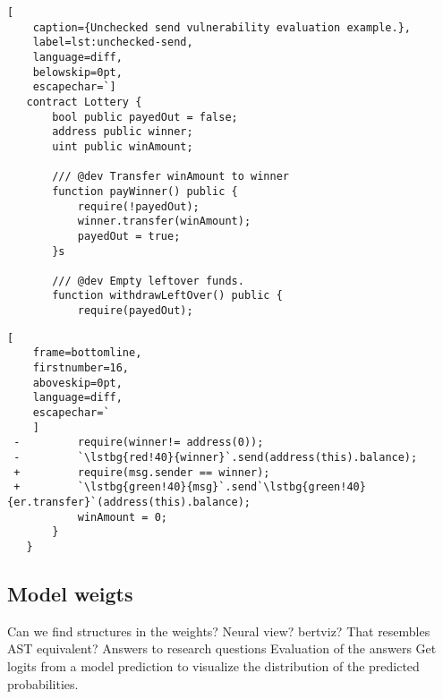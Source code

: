 \begin{lstlisting}[
    caption={Unchecked send vulnerability evaluation example.},
    label=lst:unchecked-send,
    language=diff,
    belowskip=0pt,
    escapechar=`]
   contract Lottery {
       bool public payedOut = false;
       address public winner;
       uint public winAmount;
       
       /// @dev Transfer winAmount to winner
       function payWinner() public {
           require(!payedOut);
           winner.transfer(winAmount);
           payedOut = true;
       }s

       /// @dev Empty leftover funds.
       function withdrawLeftOver() public {
           require(payedOut);
\end{lstlisting}
\begin{lstlisting}[
    frame=bottomline,
    firstnumber=16,
    aboveskip=0pt,
    language=diff,
    escapechar=`
    ]
 -         require(winner!= address(0));
 -         `\lstbg{red!40}{winner}`.send(address(this).balance);
 +         require(msg.sender == winner);
 +         `\lstbg{green!40}{msg}`.send`\lstbg{green!40}{er.transfer}`(address(this).balance);
           winAmount = 0;
       }
   }
\end{lstlisting}


\subsection{Model weigts}
Can we find structures in the weights? Neural  view? bertviz? That resembles AST equivalent?
Answers to research questions
Evaluation of the answers
Get logits from a model  prediction to visualize the distribution of the predicted probabilities.
